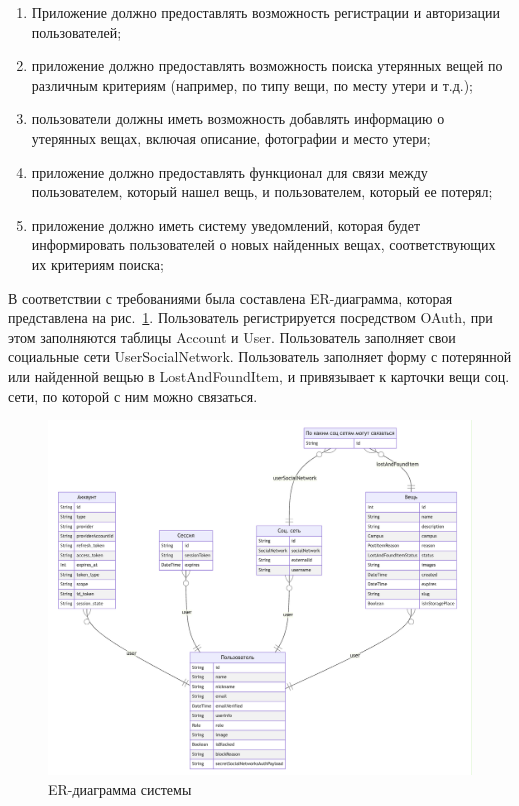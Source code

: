 \begin{enumerate}
	\item Приложение должно предоставлять возможность регистрации и авторизации пользователей;
	\item приложение должно предоставлять возможность поиска утерянных вещей по различным критериям (например, по типу вещи, по месту утери и т.д.);
	\item пользователи должны иметь возможность добавлять информацию о утерянных вещах, включая описание, фотографии и место утери;
	\item приложение должно предоставлять функционал для связи между пользователем, который нашел вещь, и пользователем, который ее потерял;
	\item приложение должно иметь систему уведомлений, которая будет информировать пользователей о новых найденных вещах, соответствующих их критериям поиска;
\end{enumerate}

В соответствии с требованиями была составлена ER-диаграмма, которая представлена на рис.~\ref{fig:erd}. Пользователь регистрируется посредством OAuth, при этом заполняются таблицы Account и User. Пользователь заполняет свои социальные сети UserSocialNetwork. Пользователь заполняет форму с потерянной или найденной вещью в LostAndFoundItem, и привязывает к карточки вещи соц. сети, по которой с ним можно связаться.

\begin{figure}[htb]
	\centering
	\includegraphics[width=.95\textwidth]{images/erd2}
	\parskip=6pt
	\caption{ER-диаграмма системы}
	\label{fig:erd}
\end{figure}


